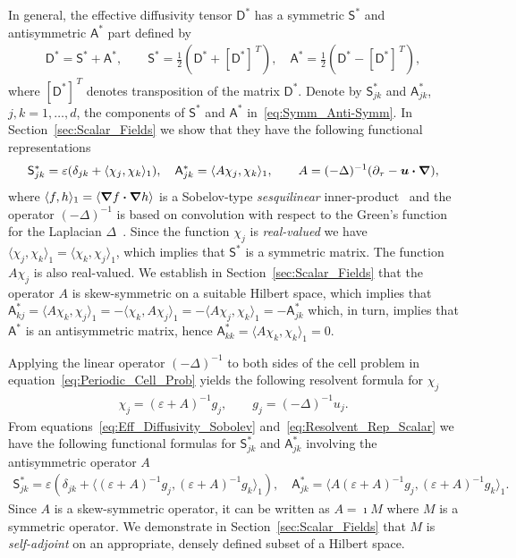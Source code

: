 \documentclass[leqno,onefignum,onetabnum]{siamltex1213}
\newcommand{\secref}[1]{Section~\ref{#1}}
\newcommand{\Dm}{\mathsf{D}}
\newcommand{\Sm}{\mathsf{S}}
\newcommand{\Am}{\mathsf{A}}
\newcommand\bnabla{\mbox{\boldmath${\nabla}$}}
\providecommand\bcdot{\boldsymbol{\cdot}}
\newcommand{\vecu}{\boldsymbol{u}}
\begin{document}
In general, the effective diffusivity tensor $\Dm^*$ has a symmetric
$\Sm^*$ and antisymmetric $\Am^*$ part defined by 
%
\begin{align}\label{eq:Symm_Anti-Symm}
  \Dm^*=\Sm^*+\Am^*,\qquad
  \Sm^*=\frac{1}{2}\left(\Dm^*+[\Dm^*]^{\,T}\right), \quad
  \Am^*=\frac{1}{2}\left(\Dm^*-[\Dm^*]^{\,T}\right),
\end{align}
%
where $[\Dm^*]^{\,T}$ denotes transposition of the matrix
$\Dm^*$. Denote by $\Sm^*_{jk}$ and $\Am^*_{jk}$, $j,k=1,\ldots,d$, the
components of $\Sm^*$ and $\Am^*$ in~\eqref{eq:Symm_Anti-Symm}. In
\secref{sec:Scalar_Fields} we show that they have the following
functional representations~\cite{Pavliotis:PHD_Thesis} 
%
\begin{align}\label{eq:Eff_Diffusivity_Sobolev}
  \Sm^*_{jk}=\varepsilon(\delta_{jk}+\langle\chi_j,\chi_k\rangle_1),
  \quad
  \Am^*_{jk}=\langle A\chi_j,\chi_k\rangle_1,
  \qquad
  A=(-\Delta)^{-1}(\partial_\tau-\vecu \bcdot\bnabla),
\end{align}
%
where $\langle f,h\rangle_1=\langle\bnabla f\bcdot\bnabla h\rangle$ is a Sobelov-type
\emph{sesquilinear} inner-product~\cite{McOwen:2003:PDE} and the
operator $(-\Delta)^{-1}$ is based on convolution with respect to the
Green's function for the Laplacian $\Delta$~\cite{Stakgold:BVP:2000}.  
Since the function $\chi_j$ is
\emph{real-valued} we have $\langle\chi_j,\chi_k\rangle_1=\langle\chi_k,\chi_j\rangle_1$, which implies that
$\Sm^*$ is a symmetric matrix. The function $A\chi_j$ is also
real-valued. We establish in \secref{sec:Scalar_Fields} that the
operator $A$ is skew-symmetric on a suitable Hilbert space, which
implies that
$\Am^*_{kj}=\langle A\chi_k,\chi_j\rangle_1=-\langle\chi_k,A\chi_j\rangle_1=-\langle A\chi_j,\chi_k\rangle_1=-\Am^*_{jk}$
which, in turn, implies that $\Am^*$ is an antisymmetric matrix, hence
$\Am^*_{kk}=\langle A\chi_k,\chi_k\rangle_1=0$.  



Applying the linear operator $(-\Delta)^{-1}$ to both sides of the cell
problem in equation~\eqref{eq:Periodic_Cell_Prob} yields the following
resolvent formula for $\chi_j$
%
\begin{align}\label{eq:Resolvent_Rep_Scalar}
  \chi_j=(\varepsilon+A)^{-1}g_j, \qquad 
  g_j=(-\Delta)^{-1}u_j.
\end{align}
%
From equations~\eqref{eq:Eff_Diffusivity_Sobolev}
and~\eqref{eq:Resolvent_Rep_Scalar} we have the following functional
formulas for $\Sm^*_{jk}$ and $\Am^*_{jk}$ involving the
antisymmetric operator $A$
%
\begin{align}\label{eq:Eff_Diff_Resolvent_Sobolev}
 \Sm^*_{jk}=\varepsilon\left(\delta_{jk}
  +\langle(\varepsilon+A)^{-1}g_j,(\varepsilon+A)^{-1}g_k\rangle_1\right), 
  \quad
 \Am^*_{jk}=\langle A(\varepsilon+A)^{-1}g_j,(\varepsilon+A)^{-1}g_k\rangle_1.
\end{align}
%
Since $A$ is a skew-symmetric operator, it can be written as $A=\imath M$
where $M$ is a symmetric operator. We demonstrate in
\secref{sec:Scalar_Fields} that $M$ is \emph{self-adjoint} on an
appropriate, densely defined subset of a Hilbert space.
\end{document}
